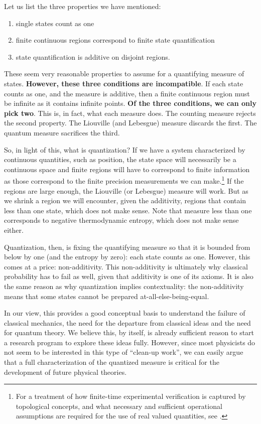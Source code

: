 \documentclass[entropy,article,submit,pdftex,moreauthors]{Definitions/mdpi}
\begin{document}
Let us list the three properties we have mentioned:
\begin{enumerate}
	\item single states count as one
	\item finite continuous regions correspond to finite state quantification
	\item state quantification is additive on disjoint regions.
\end{enumerate}
These seem very reasonable properties to assume for a quantifying measure of states. \textbf{However, these three conditions are incompatible}. If each state counts as one, and the measure is additive, then a finite continuous region must be infinite as it contains infinite points. \textbf{Of the three conditions, we can only pick two}. This is, in fact, what each measure does. The counting measure rejects the second property. The Liouville (and Lebesgue) measure discards the first. The quantum measure sacrifices the third.

So, in light of this, what is quantization? If we have a system characterized by continuous quantities, such as position, the state space will necessarily be a continuous space and finite regions will have to correspond to finite information as those correspond to the finite precision measurements we can make.\footnote{For a treatment of how finite-time experimental verification is captured by topological concepts, and what necessary and sufficient operational assumptions are required for the use of real valued quantities, see \cite{kelly1996,aop-book}.} If the regions are large enough, the Liouville (or Lebesgue) measure will work. But as we shrink a region we will encounter, given the additivity, regions that contain less than one state, which does not make sense. Note that measure less than one corresponds to negative thermodynamic entropy, which does not make sense either.

Quantization, then, is fixing the quantifying measure so that it is bounded from below by one (and the entropy by zero): each state counts as one. However, this comes at a price: non-additivity. This non-additivity is ultimately why classical probability has to fail as well, given that additivity is one of its axioms. It is also the same reason as why quantization implies contextuality: the non-additivity means that some states cannot be prepared at-all-else-being-equal.

In our view, this provides a good conceptual basis to understand the failure of classical mechanics, the need for the departure from classical ideas and the need for quantum theory. We believe this, by itself, is already sufficient reason to start a research program to explore these ideas fully. However, since most physicists do not seem to be interested in this type of ``clean-up work'', we can easily argue that a full characterization of the quantized measure is critical for the development of future physical theories.
\end{document}
